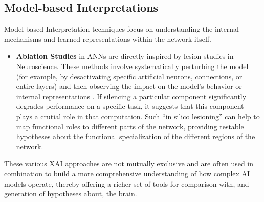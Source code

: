 \subsection{Model-based Interpretations}
Model-based Interpretation techniques focus on understanding the internal mechanisms and learned representations within the network itself.
\begin{itemize}
    \item \textbf{Ablation Studies} in ANNs are directly inspired by lesion studies in Neuroscience. These methods involve systematically perturbing the model (for example, by desactivating specific artificial neurons, connections, or entire layers) and then observing the impact on the model's behavior or internal representations \cite{kriegeskorte2018cognitive}. If silencing a particular component significantly degrades performance on a specific task, it suggests that this component plays a crutial role in that computation. Such ``in silico lesioning'' can help to map functional roles to different parts of the network, providing testable hypotheses about the functional specialization of the different regions of the network.
\end{itemize}

These various XAI approaches are not mutually exclusive and are often used in combination to build a more comprehensive understanding of how complex AI models operate, thereby offering a richer set of tools for comparison with, and generation of hypotheses about, the brain.

